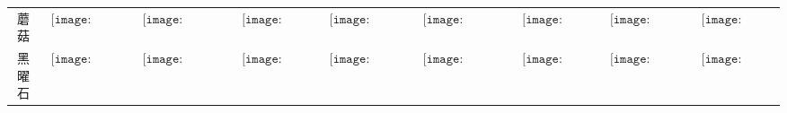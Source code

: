 \begin{longtable}{|c|cccccccc|}
蘑菇&$\begin{array}{c}\texttt{[image: figures/Mushroom\_Candle.png]}\end{array}$&$\begin{array}{c}\texttt{[image: figures/Mushroom\_Candelabra.png]}\end{array}$&$\begin{array}{c}\texttt{[image: figures/Mushroom\_Lamp.png]}\end{array}$&$\begin{array}{c}\texttt{[image: figures/Mushroom\_Lantern.png]}\end{array}$&$\begin{array}{c}\texttt{[image: figures/Mushroom\_Chandelier.png]}\end{array}$&$\begin{array}{c}\texttt{[image: figures/Mushroom\_Door.png]}\end{array}$&$\begin{array}{c}\texttt{[image: figures/Mushroom\_Toilet.png]}\end{array}$&$\begin{array}{c}\texttt{[image: figures/Mushroom\_Chest.png]}\end{array}$\\
黑曜石&$\begin{array}{c}\texttt{[image: figures/Obsidian\_Candle.png]}\end{array}$&$\begin{array}{c}\texttt{[image: figures/Obsidian\_Candelabra.png]}\end{array}$&$\begin{array}{c}\texttt{[image: figures/Obsidian\_Lamp.png]}\end{array}$&$\begin{array}{c}\texttt{[image: figures/Obsidian\_Lantern.png]}\end{array}$&$\begin{array}{c}\texttt{[image: figures/Obsidian\_Chandelier.png]}\end{array}$&$\begin{array}{c}\texttt{[image: figures/Obsidian\_Door.png]}\end{array}$&$\begin{array}{c}\texttt{[image: figures/Obsidian\_Toilet.png]}\end{array}$&$\begin{array}{c}\texttt{[image: figures/Obsidian\_Chest.png]}\end{array}$\\

\end{longtable}
